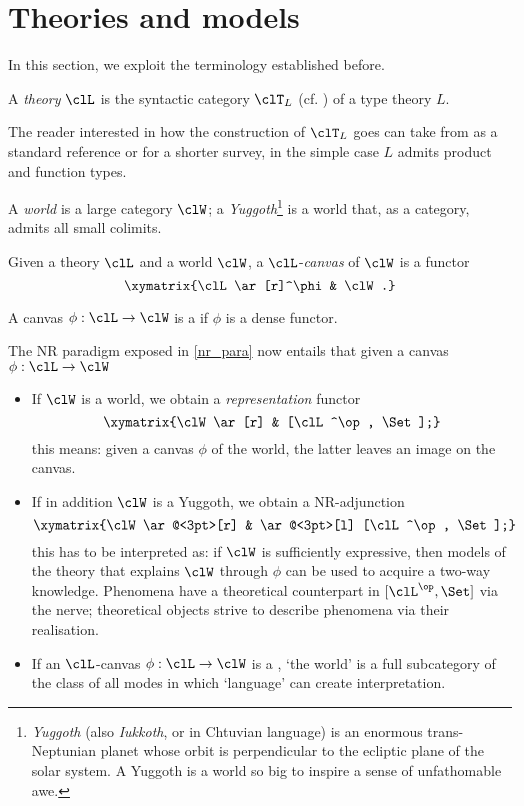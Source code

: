 \section{Theories and models}\label{sec_4_theories}
\label{sec:orge02f333}
In this section, we exploit the terminology established before.
\begin{definition}[Theory]\label{teoria}
  A \emph{theory} $\clL$ is the syntactic category $\clT_L$ (cf. \cite[II.11]{lambek1988introduction}) of a type theory $L$.
\end{definition}
The reader interested in how the construction of $\clT_L$ goes can take from \cite{lambek1988introduction} as a standard reference or \cite{abramskyno} for a shorter survey, in the simple case $L$ admits product and function types.
\begin{definition}\label{mondo_yalda}
  A \emph{world} is a large category $\clW$; a \emph{Yuggoth}\footnote{\emph{Yuggoth} (also \emph{Iukkoth}, or {\yugg} in Chtuvian language) is an enormous trans-Neptunian planet whose orbit is perpendicular to the ecliptic plane of the solar system. A Yuggoth is a world so big to inspire a sense of unfathomable awe.} is a world that, as a category, admits all small colimits.
\end{definition}
\begin{definition}\label{canvas_scienza}
  Given a theory $\clL$ and a world $\clW$, a $\clL$-\emph{canvas} of $\clW$ is a functor
  \[\xymatrix{\clL \ar[r]^\phi & \clW.}\]

  A canvas $\phi : \clL \to \clW$ is a \emph{\science} if $\phi$ is a dense functor.
\end{definition}
\begin{remark}\label{remark_yuggoth_1}
  The NR paradigm exposed in \autoref{nr_para} now entails that given a canvas $\phi : \clL \to \clW$
  \begin{itemize}
    \item If $\clW$ is a world, we obtain a \emph{representation} functor
          \[ \xymatrix{\clW \ar[r] & [\clL^\op, \Set];} \label{mvndvs}\]
          this means: given a canvas $\phi$ of the world, the latter leaves an image on the canvas.
    \item If in addition $\clW$ is a Yuggoth, we obtain a NR-adjunction
          \[\xymatrix{\clW \ar@<3pt>[r] & \ar@<3pt>[l] [\clL^\op, \Set];}\]
          this has to be interpreted as: if $\clW$ is sufficiently expressive, then models of the theory that explains $\clW$ through $\phi$ can be used to acquire a two-way knowledge. Phenomena have a theoretical counterpart in $[\clL^\op,\Set]$ via the nerve; theoretical objects strive to describe phenomena via their realisation.
    \item If an $\clL$-canvas $\phi : \clL \to \clW$ is a \science, `the world' is a full subcategory of the class of all modes in which `language' can create interpretation.
  \end{itemize}
\end{remark}
